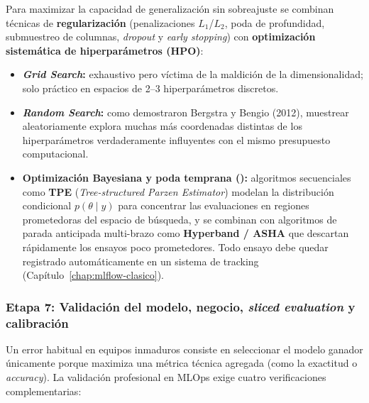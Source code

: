 Para maximizar la capacidad de generalización sin sobreajuste se combinan técnicas de \textbf{regularización} (penalizaciones $L_1$/$L_2$, poda de profundidad, submuestreo de columnas, \textit{dropout} y \textit{early stopping}) con \textbf{optimización sistemática de hiperparámetros (HPO)}:
\begin{itemize}
  \item \textbf{\textit{Grid Search}:} exhaustivo pero víctima de la maldición de la dimensionalidad; solo práctico en espacios de 2--3 hiperparámetros discretos.
  \item \textbf{\textit{Random Search}:} como demostraron Bergstra y Bengio (2012), muestrear aleatoriamente explora muchas más coordenadas distintas de los hiperparámetros verdaderamente influyentes con el mismo presupuesto computacional.
  \item \textbf{Optimización Bayesiana y poda temprana ():} algoritmos secuenciales como \textbf{TPE} (\textit{Tree-structured Parzen Estimator}) modelan la distribución condicional $p(\theta \mid y)$ para concentrar las evaluaciones en regiones prometedoras del espacio de búsqueda, y se combinan con algoritmos de parada anticipada multi-brazo como \textbf{Hyperband / ASHA} que descartan rápidamente los ensayos poco prometedores. Todo ensayo debe quedar registrado automáticamente en un sistema de tracking (Capítulo~\ref{chap:mlflow-clasico}).
\end{itemize}

\subsubsection{Etapa 7: Validación del modelo, negocio, \textit{sliced evaluation} y calibración}

Un error habitual en equipos inmaduros consiste en seleccionar el modelo ganador únicamente porque maximiza una métrica técnica agregada (como la exactitud o \textit{accuracy}). La validación profesional en MLOps exige cuatro verificaciones complementarias:

